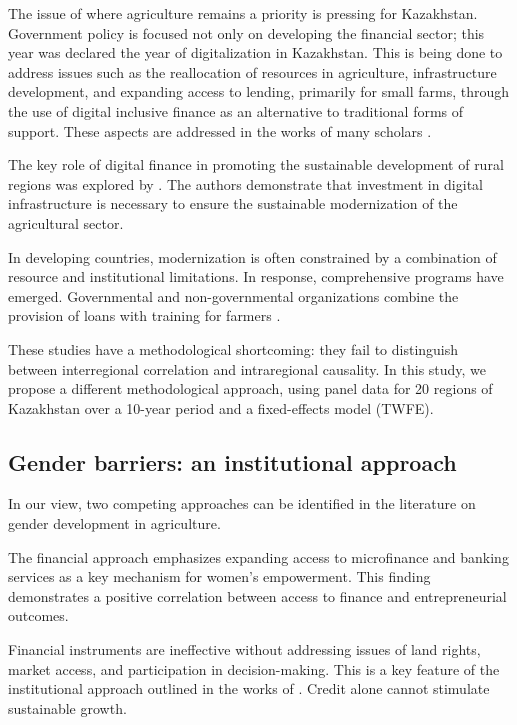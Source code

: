 ﻿\documentclass[pdflatex,sn-mathphys-ay]{sn-jnl}
\begin{document}
The issue of where agriculture remains a priority is pressing for
Kazakhstan. Government policy is focused not only on developing the
financial sector; this year was declared the year of digitalization in
Kazakhstan. This is being done to address issues such as the
reallocation of resources in agriculture, infrastructure development,
and expanding access to lending, primarily for small farms, through the
use of digital inclusive finance as an alternative to traditional forms
of support. These aspects are addressed in the works of many scholars
\citep{ref56,ref80}.

The key role of digital finance in promoting the sustainable development
of rural regions was explored by \citet{ref87}.
The authors demonstrate that investment in digital infrastructure is
necessary to ensure the sustainable modernization of the agricultural
sector.

In developing countries, modernization is often constrained by a
combination of resource and institutional limitations. In response,
comprehensive programs have emerged. Governmental and non-governmental
organizations combine the provision of loans with training for farmers
\citep{ref74,ref13,ref73}.

These studies have a methodological shortcoming: they fail to
distinguish between interregional correlation and intraregional
causality. In this study, we propose a different methodological
approach, using panel data for 20 regions of Kazakhstan over a 10-year
period and a fixed-effects model (TWFE).

\subsection{Gender barriers: an institutional approach}

In our view, two competing approaches can be identified in the
literature on gender development in agriculture.

The financial approach \citep{ref60,ref88} emphasizes expanding access to microfinance and banking
services as a key mechanism for women's empowerment. This finding demonstrates a
positive correlation between access to finance and entrepreneurial
outcomes.

Financial instruments are ineffective without addressing issues of land
rights, market access, and participation in decision-making. This is a
key feature of the institutional approach outlined in the works of
\citep{ref78,ref26,ref02,ref32,ref36,ref66}. Credit alone
cannot stimulate sustainable growth.
\end{document}
